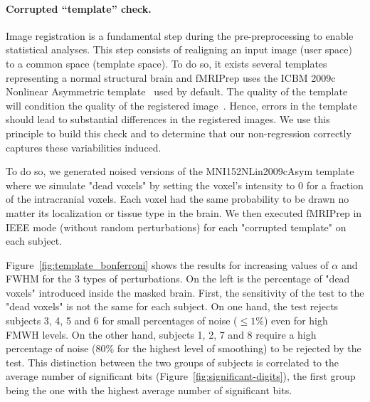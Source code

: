\documentclass{article}
\newcommand{\fmriprep}{fMRIPrep\xspace}
\begin{document}
\paragraph{Corrupted ``template'' check.}

Image registration is a fundamental step during the pre-preprocessing to enable statistical analyses.
This step consists of realigning an input image (user space) to a common space (template space). To do so, it exists several templates representing a normal structural brain and \fmriprep uses the ICBM 2009c Nonlinear Asymmetric template~\cite{fonov2011unbiased} used by default. The quality of the template will condition the quality of the registered image~\cite{li2021moving}. Hence, errors in the template should lead to substantial differences in the registered images. We use this principle to build this check and to determine that our non-regression correctly captures these variabilities induced.

To do so, we generated noised versions of the MNI152NLin2009cAsym template where we simulate "dead voxels" by setting the voxel's intensity to 0 for a fraction of the intracranial voxels. Each voxel had the same probability to be drawn no matter its localization or tissue type in the brain. We then executed \fmriprep in IEEE mode (without random perturbations) for each "corrupted template" on each subject.

Figure~\ref{fig:template_bonferroni} shows the results for increasing values of $\alpha$ and FWHM for the 3 types of perturbations. On the left is the percentage of "dead voxels" introduced inside the masked brain. First, the sensitivity of the test to the "dead voxels" is not the same for each subject. On one hand, the test rejects subjects 3, 4, 5 and 6 for small percentages of noise ($\leq 1\%$) even for high FMWH levels. On the other hand, subjects 1, 2, 7 and 8 require a high percentage of noise (80\% for the highest level of smoothing) to be rejected by the test. This distinction between the two groups of subjects is correlated to the average number of significant bits (Figure~\ref{fig:significant-digits}), the first group being the one with the highest average number of significant bits.
\end{document}
